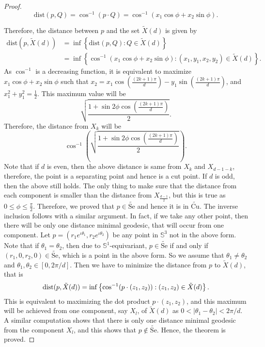 \begin{proof}
	\begin{displaymath}
		\mathrm{dist}(p,Q) = \cos^{-1}(p\cdot Q) = \cos^{-1} \left(x_1\cos \phi + x_2\sin \phi\right).
	\end{displaymath} 

	\noindent Therefore, the distance between $p$ and the set $\tilde{X}(d)$ is given by
	\begin{align*}
		\mathrm{dist}(p,\tilde{X}(d)) & = \inf \left\{\mathrm{dist}(p,Q):Q\in \tilde{X}(d)\right\}\\
		& = \inf \left\{\cos^{-1}\left(x_1\cos \phi+x_2\sin\phi\right):\left(x_1,y_1,x_2,y_2\right)\in \tilde{X}(d) \right\}. 
	\end{align*}
	As $\cos^{-1}$ is a decreasing function, it is equivalent to maximize $x_1\cos \phi + x_2\sin \phi$ such that $x_2=x_1\cos \left(\frac{(2k+1)\pi}{d}\right)-y_1\sin\left(\frac{(2k+1)\pi}{d}\right)$, and $x_1^2+y_1^2=\frac{1}{2}$. This maximum value will be
	\begin{displaymath}
		\sqrt{\frac{1+\sin 2\phi\cos \left(\frac{(2k+1)\pi}{d}\right)}{2}}.
	\end{displaymath}
	Therefore, the distance from $X_k$ will be
	\begin{displaymath}
		\cos^{-1} \left(\sqrt{\frac{1+\sin 2\phi\cos \left(\frac{(2k+1)\pi}{d}\right)}{2}}\right).
	\end{displaymath}
	Note that if $d$ is even, then the above distance is same from $X_k$ and $X_{d-1-k}$, therefore, the point is a separating point and hence is a cut point. If $d$ is odd, then the above still holds. The only thing to make sure that the distance from each component is smaller than the distance from $X_{\frac{d-1}{2}}$, but this is true as $0\le \phi \le \frac{\pi}{2}$. Therefore, we proved that $p\in \widetilde{\mathrm{Se}}$ and hence it is in $\widetilde{\mathrm{Cu}}$. The inverse inclusion follows with a similar argument. In fact, if we take any other point, then there will be only one distance minimal geodesic, that will occur from one component. Let $p=\left(r_1e^{\iota \theta_1},r_2 e^{\iota \theta_2}\right)$ be any point in $\mathbb{S}^3$ not in the above form. Note that if $\theta_1=\theta_2$, then due to $\mathbb{S}^1$-equivariant, $p\in \widetilde{\mathrm{Se}}$ if and only if $(r_1,0,r_2,0)\in \widetilde{\mathrm{Se}}$, which is a point in the above form. So we assume that $\theta_1\neq \theta_2$ and $\theta_1,\theta_2 \in [0,2\pi/d]$. Then we have to minimize the distance from $p$ to $\tilde{X}(d)$, that is
	\begin{displaymath}
		\operatorname{dist}(p,\tilde{X}(d)) = \inf \left\{\cos^{-1}(p\cdot (z_1,z_2)):(z_1,z_2)\in \tilde{X}(d)\right\}.
	\end{displaymath} 
	This is equivalent to maximizing the dot product $p\cdot (z_1,z_2)$, and this maximum will be achieved from one component, say $X_l$, of $\tilde{X}(d)$ as $0<|\theta_1-\theta_2|<2\pi/d$. A similar computation shows that there is only one distance minimal geodesic from the component $X_l$, and this shows that $p\notin \widetilde{\mathrm{Se}}$. Hence, the theorem is proved.  
\end{proof}

